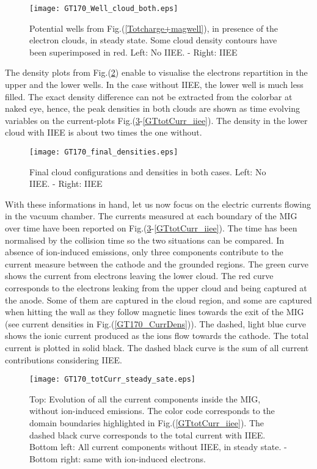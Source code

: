 \begin{figure}[h!]
\centering
	\texttt{[image: GT170\_Well\_cloud\_both.eps]}
	\caption{\label{Well_cloud_both} Potential wells from Fig.(\ref{Totcharge+magwell}), in presence of the electron clouds, in steady state. Some cloud density contours have been superimposed in red. Left: No IIEE. - Right: IIEE}
\end{figure}

The density plots from Fig.(\ref{GT_final_densities}) enable to visualise the electrons repartition in the upper and the lower wells. In the case without IIEE, the lower well is much less filled. The exact density difference can not be extracted from the colorbar at naked eye, hence, the peak densities in both clouds are shown as time evolving variables on the current-plots Fig.(\ref{GTtotCurr_steadyState}-\ref{GTtotCurr_iiee}). The density in the lower cloud with IIEE is about two times the one without. \\

\begin{figure}[h!]
\centering
	\texttt{[image: GT170\_final\_densities.eps]}
	\caption{\label{GT_final_densities} Final cloud configurations and densities in both cases. Left: No IIEE. - Right: IIEE}
\end{figure}

With these informations in hand, let us now focus on the electric currents flowing in the vacuum chamber. The currents measured at each boundary of the MIG over time have been reported on  Fig.(\ref{GTtotCurr_steadyState}-\ref{GTtotCurr_iiee}). The time has been normalised by the collision time so the two situations can be compared. In absence of ion-induced emissions, only three components contribute to the current measure between the cathode and the grounded regions. The green curve shows the current from electrons leaving the lower cloud. The red curve corresponds to the electrons leaking from the upper cloud and being captured at the anode. Some of them are captured in the cloud region, and some are captured when hitting the wall as they follow magnetic lines towards the exit of the MIG (see current densities in Fig.(\ref{GT170_CurrDens})). The dashed, light blue curve shows the ionic current produced as the ions flow towards the cathode. The total current is plotted in solid black. The dashed black curve is the sum of all current contributions considering IIEE.\\

\begin{figure}[h!]
\centering
	\texttt{[image: GT170\_totCurr\_steady\_sate.eps]}
	\caption{\label{GTtotCurr_steadyState} Top: Evolution of all the current components inside the MIG, without ion-induced emissions. The color code corresponds to the domain boundaries highlighted in Fig.(\ref{GTtotCurr_iiee}). The dashed black curve corresponds to the total current with IIEE. Bottom left: All current components without IIEE, in steady state. - Bottom right: same with ion-induced electrons. }
\end{figure}

